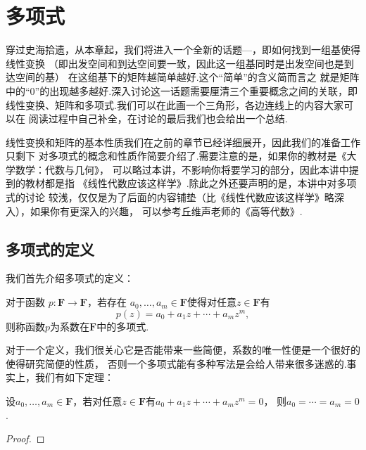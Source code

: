 \chapter{多项式}

穿过史海拾遗，从本章起，我们将进入一个全新的话题—，即如何找到一组基使得线性变换
（即出发空间和到达空间要一致，因此这一组基同时是出发空间也是到达空间的基）
在这组基下的矩阵越简单越好.这个``简单''的含义简而言之
就是矩阵中的``0''的出现越多越好.深入讨论这一话题需要厘清三个重要概念之间的关联，即
线性变换、矩阵和多项式.我们可以在此画一个三角形，各边连线上的内容大家可以在
阅读过程中自己补全，在讨论的最后我们也会给出一个总结.

\begin{figure}[H]
    \centering
\end{figure}

线性变换和矩阵的基本性质我们在之前的章节已经详细展开，因此我们的准备工作只剩下
对多项式的概念和性质作简要介绍了.需要注意的是，如果你的教材是《大学数学：代数与几何》，
可以略过本讲，不影响你将要学习的部分，因此本讲中提到的教材都是指
《线性代数应该这样学》.除此之外还要声明的是，本讲中对多项式的讨论
较浅，仅仅是为了后面的内容铺垫（比《线性代数应该这样学》略深入），如果你有更深入的兴趣，
可以参考丘维声老师的《高等代数》.

\section{多项式的定义}
我们首先介绍多项式的定义：
\begin{definition}
    对于函数 $p:\mathbf{F}\to\mathbf{F}$，若存在
    $a_0,\ldots,a_m\in\mathbf{F}$使得对任意$z\in\mathbf{F}$有
    \begin{equation}\label{eq:17:多项式定义}
        p(z)=a_0+a_1z+\cdots+a_mz^m,
    \end{equation}
    则称函数$p$为系数在$\mathbf{F}$中的多项式.
\end{definition}

对于一个定义，我们很关心它是否能带来一些简便，系数的唯一性便是一个很好的使得研究简便的性质，
否则一个多项式能有多种写法是会给人带来很多迷惑的.事实上，我们有如下定理：
\begin{theorem}
    设$a_0,\ldots,a_m\in\mathbf{F}$，若对任意$z\in\mathbf{F}$有$a_0+a_1z+\cdots+a_mz^m=0$，
    则$a_0=\cdots=a_m=0$.
\end{theorem}
\begin{proof}
    
\end{proof}

